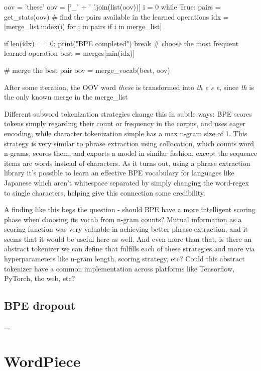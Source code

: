 \begin{python}
oov = 'these'
oov = ['_' + ' '.join(list(oov))]
i = 0
while True:
    pairs = get_stats(oov)
    # find the pairs available in the learned operations
    idx = [merge_list.index(i) for i in pairs if i in merge_list]

    if len(idx) == 0:
        print("BPE completed")
        break
    # choose the most frequent learned operation
    best = merges[min(idx)]

    # merge the best pair
    oov = merge_vocab(best, oov)
\end{python}

After some iteration, the OOV word \emph{these} is transformed into \emph{th e s e}, since \emph{th} is the only known merge in the merge\_list

Different subword tokenization strategies change this in subtle ways: BPE scores tokens simply regarding their count or frequency in the corpus, and uses eager encoding, while character tokenization simple has a max n-gram size of 1. This strategy is very similar to phrase extraction using collocation, which counts word n-grams, scores them, and exports a model in similar fashion, except the sequence items are words instead of characters. As it turns out, using a phrase extraction library it's possible to learn an effective BPE vocabulary for languages like Japanese which aren't whitespace separated by simply changing the word-regex to single characters, helping give this connection some credibility.

A finding like this begs the question - should BPE have a more intelligent scoring phase when choosing its vocab from n-gram counts? Mutual information as a scoring function was very valuable in achieving better phrase extraction, and it seems that it would be useful here as well. And even more than that, is there an abstract tokenizer we can define that fulfills each of these strategies and more via hyperparameters like n-gram length, scoring strategy, etc? Could this abstract tokenizer have a common implementation across platforms like Tensorflow, PyTorch, the web, etc?

\subsection{BPE dropout}

...

\section{WordPiece}

